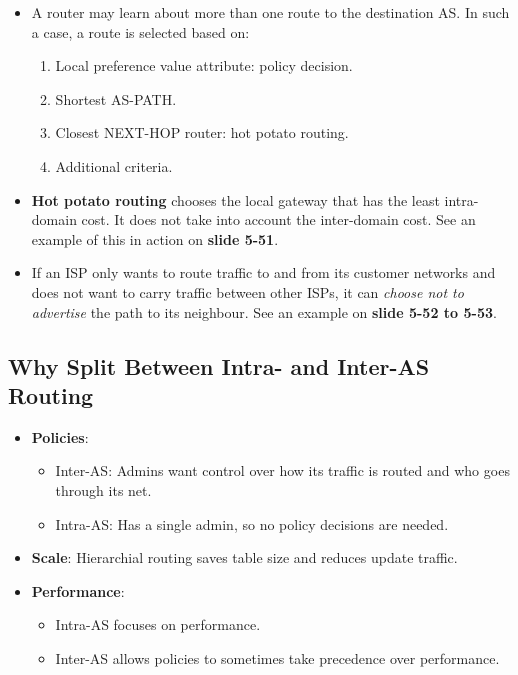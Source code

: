 \documentclass{article}
\begin{document}
\begin{itemize}
\begin{itemize}
\clearpage

\end{itemize}
\item A router may learn about more than one route to the destination AS. In such a case, a route is selected based on:
\begin{enumerate}
\item Local preference value attribute: policy decision.
\item Shortest AS-PATH.
\item Closest NEXT-HOP router: hot potato routing.
\item Additional criteria.
\end{enumerate}
\item {\bf Hot potato routing} chooses the local gateway that has the least intra-domain cost. It does not take into account the inter-domain cost. See an example of this in action on {\bf slide 5-51}.
\item If an ISP only wants to route traffic to and from its customer networks and does not want to carry traffic between other ISPs, it can \emph{choose not to advertise} the path to its neighbour. See an example on {\bf slide 5-52 to 5-53}.
\end{itemize}

\subsection{Why Split Between Intra- and Inter-AS Routing}

\begin{itemize}
\item {\bf Policies}:
\begin{itemize}
\item Inter-AS: Admins want control over how its traffic is routed and who goes through its net.
\item Intra-AS: Has a single admin, so no policy decisions are needed.
\end{itemize}
\item {\bf Scale}: Hierarchial routing saves table size and reduces update traffic.
\item {\bf Performance}:
\begin{itemize}
\item Intra-AS focuses on performance.
\item Inter-AS allows policies to sometimes take precedence over performance.
\end{itemize}
\end{itemize}
\end{document}

